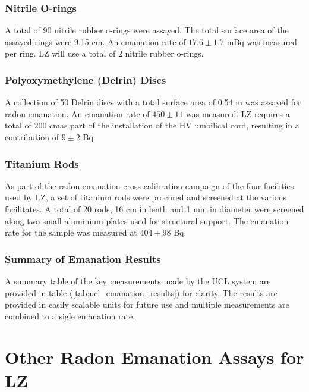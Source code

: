 \subsubsection{Nitrile O-rings}

A total of 90 nitrile rubber o-rings were assayed. The total surface area of the assayed rings were 9.15 cm\squared. An emanation rate of $17.6\pm1.7$ mBq was measured per ring. LZ will use a total of 2 nitrile rubber o-rings. 

\subsubsection{Polyoxymethylene (Delrin) Discs}

A collection of 50 Delrin discs with a total surface area of 0.54 m\squared{} was assayed for radon emanation. An emanation rate of $450\pm11$ \uBqms was measured. LZ requires a total of 200 cm\squared as part of the installation of the HV umbilical cord, resulting in a contribution of $9\pm2$ \micro{}Bq.


\subsubsection{Titanium Rods}

As part of the radon emanation cross-calibration campaign of the four facilities used by LZ, a set of titanium rods were procured and screened at the various facilitates. A total of 20 rods, 16 cm in lenth and 1 mm in diameter were screened along two small aluminium plates used for structural support. The emanation rate for the sample was measured at $404\pm98$ \micro{}Bq. 


\subsubsection{Summary of Emanation Results}

A summary table of the key measurements made by the UCL system are provided in table (\ref{tab:ucl_emanation_results}) for clarity. The results are provided in easily scalable units for future use and multiple measurements are combined to a sigle emanation rate. 
%

%


\section{Other Radon Emanation Assays for LZ}
\label{sec:otherradon}

